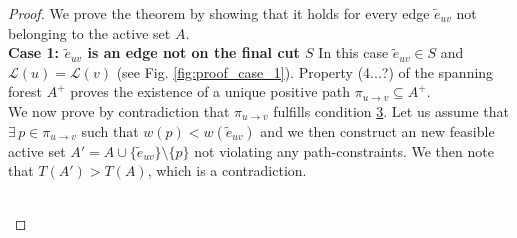 \documentclass[12pt]{article}
\newcommand\TODO[1]{\fbox{\textcolor{red}{TODO: #1}}}
\begin{document}
\begin{proof}
We prove the theorem by showing that it holds for every edge $\tilde{e}_{uv}$ not belonging to the active set $A$. \\

\noindent \textbf{Case 1: $\tilde{e}_{uv}$ is an edge not on the final cut $S$} 
In this case $\tilde{e}_{uv} \in S$ and $\mathcal{L}(u) = \mathcal{L}(v)$ (see Fig. \ref{fig:proof_case_1}).
Property (4...?) of the spanning forest $A^+$ proves the existence of a unique positive path ${\pi_{u \rightarrow v}\subseteq A^+}$. \\
We now prove by contradiction that $\pi_{u \rightarrow v}$ fulfills condition \hyperref[cond_3]{3}. Let us assume that $\exists \, p\in \pi_{u \rightarrow v}$ such that $w(p)< w(\tilde{e}_{uv})$ and we then construct an new feasible active set $A'= A \cup \{\tilde{e}_{uv}\} \setminus \{p\}$ not violating any path-constraints. We then note that $T(A')>T(A)$, which is a contradiction. 

\TODO{Explain better this last part}\\



\end{proof}
\end{document}

